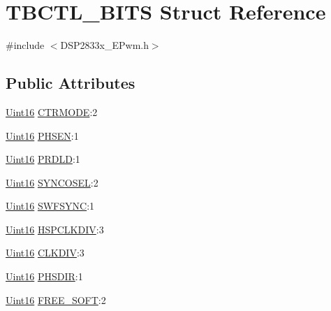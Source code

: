 \hypertarget{struct_t_b_c_t_l___b_i_t_s}{}\section{T\+B\+C\+T\+L\+\_\+\+B\+I\+T\+S Struct Reference}
\label{struct_t_b_c_t_l___b_i_t_s}


{\ttfamily \#include $<$D\+S\+P2833x\+\_\+\+E\+Pwm.\+h$>$}

\subsection*{Public Attributes}
\begin{DoxyCompactItemize}
\item 
\hyperlink{_d_s_p2833x___device_8h_a59a9f6be4562c327cbfb4f7e8e18f08b}{Uint16} \hyperlink{struct_t_b_c_t_l___b_i_t_s_a725224096dc89831541ef37ad28dd446}{C\+T\+R\+M\+O\+D\+E}\+:2
\item 
\hyperlink{_d_s_p2833x___device_8h_a59a9f6be4562c327cbfb4f7e8e18f08b}{Uint16} \hyperlink{struct_t_b_c_t_l___b_i_t_s_a96a4da5ef136835e2b22b72ac69f7a8c}{P\+H\+S\+E\+N}\+:1
\item 
\hyperlink{_d_s_p2833x___device_8h_a59a9f6be4562c327cbfb4f7e8e18f08b}{Uint16} \hyperlink{struct_t_b_c_t_l___b_i_t_s_a065fbfe287f5b67070779d6168315b98}{P\+R\+D\+L\+D}\+:1
\item 
\hyperlink{_d_s_p2833x___device_8h_a59a9f6be4562c327cbfb4f7e8e18f08b}{Uint16} \hyperlink{struct_t_b_c_t_l___b_i_t_s_afa440d6bae07f57ad2f2661d47a1d7ab}{S\+Y\+N\+C\+O\+S\+E\+L}\+:2
\item 
\hyperlink{_d_s_p2833x___device_8h_a59a9f6be4562c327cbfb4f7e8e18f08b}{Uint16} \hyperlink{struct_t_b_c_t_l___b_i_t_s_a1d2212fc310d325ea8640851029b87f3}{S\+W\+F\+S\+Y\+N\+C}\+:1
\item 
\hyperlink{_d_s_p2833x___device_8h_a59a9f6be4562c327cbfb4f7e8e18f08b}{Uint16} \hyperlink{struct_t_b_c_t_l___b_i_t_s_aa49e849f8079ae14e86faa869201df7c}{H\+S\+P\+C\+L\+K\+D\+I\+V}\+:3
\item 
\hyperlink{_d_s_p2833x___device_8h_a59a9f6be4562c327cbfb4f7e8e18f08b}{Uint16} \hyperlink{struct_t_b_c_t_l___b_i_t_s_aed02f6a3e79286a331f1720cd7317e4b}{C\+L\+K\+D\+I\+V}\+:3
\item 
\hyperlink{_d_s_p2833x___device_8h_a59a9f6be4562c327cbfb4f7e8e18f08b}{Uint16} \hyperlink{struct_t_b_c_t_l___b_i_t_s_abb613a08912cbf93f40d8db007f62ba3}{P\+H\+S\+D\+I\+R}\+:1
\item 
\hyperlink{_d_s_p2833x___device_8h_a59a9f6be4562c327cbfb4f7e8e18f08b}{Uint16} \hyperlink{struct_t_b_c_t_l___b_i_t_s_af954874375a6c568736221d424bba615}{F\+R\+E\+E\+\_\+\+S\+O\+F\+T}\+:2
\end{DoxyCompactItemize}


